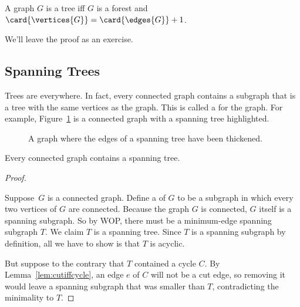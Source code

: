 \begin{lemma}\label{lem:iffe=v-1}
A graph $G$ is a tree iff $G$ is a forest and $\card{\vertices{G}} =
\card{\edges{G}} +1$.
\end{lemma}

We'll leave the proof as an exercise.
\begin{editingnotes}
\end{editingnotes}

\subsection{Spanning Trees}\label{spantree_subsec}

Trees are everywhere.  In fact, every connected graph contains a
subgraph that is a tree with the same vertices as the graph.  This is
called a  for the graph.  For example,
Figure~\ref{fig:5LL} is a connected graph with a spanning tree
highlighted.

\begin{figure}


\caption{A graph where the edges of a spanning tree have been
  thickened.}

\label{fig:5LL}

\end{figure}

\begin{theorem}
Every connected graph contains a spanning tree.
\end{theorem}

\begin{proof}
\begin{editingnotes}
\end{editingnotes}
Suppose~$G$ is a connected graph.  Define a 
of $G$ to be a subgraph in which every two vertices of $G$ are
connected.  Because the graph $G$ is connected, $G$ itself is a
spanning subgraph.  So by WOP, there must be a minimum-edge spanning
subgraph $T$.  We claim $T$ is a spanning tree.  Since $T$ is a
spanning subgraph by definition, all we have to show is that $T$ is
acyclic.

But suppose to the contrary that $T$ contained a cycle $C$.  By
Lemma~\ref{lem:cutiffcycle}, an edge $e$ of $C$ will not be a cut edge, so
removing it would leave a spanning subgraph that was smaller than $T$,
contradicting the minimality to $T$.
\end{proof}

